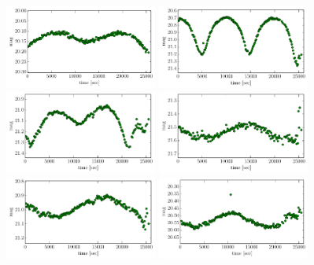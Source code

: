 \documentclass[iop, apj]{emulateapj}
\newcommand{\?}{\stackrel{?}{=}}
\begin{document}
\clearpage
\begin{figure}[t]
\centering
\includegraphics[width=5cm,clip,angle=90]{pic/binary/cand_1.pdf}
\includegraphics[width=5cm,clip,angle=90]{pic/binary/cand_2.pdf}
\includegraphics[width=5cm,clip,angle=90]{pic/binary/cand_3.pdf}
\includegraphics[width=5cm,clip,angle=90]{pic/binary/cand_4.pdf}
\includegraphics[width=5cm,clip,angle=90]{pic/binary/cand_5.pdf}
\includegraphics[width=5cm,clip,angle=90]{pic/binary/cand_6.pdf}

\end{figure}
\end{document}
